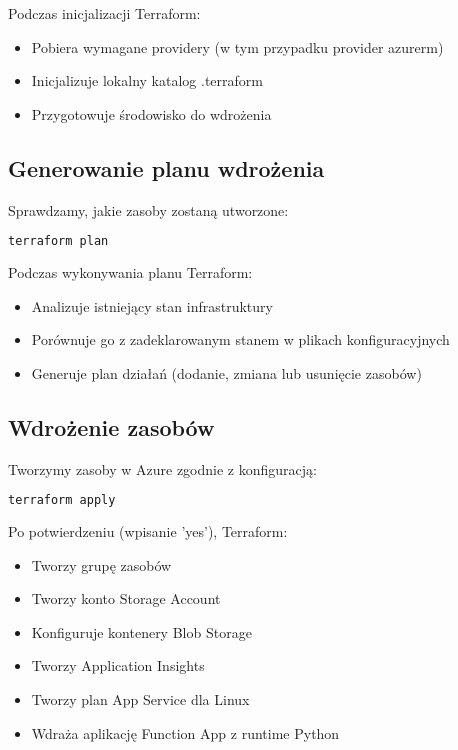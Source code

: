 \documentclass{article}
\begin{document}
Podczas inicjalizacji Terraform:
\begin{itemize}
    \item Pobiera wymagane providery (w tym przypadku provider azurerm)
    \item Inicjalizuje lokalny katalog .terraform
    \item Przygotowuje środowisko do wdrożenia
\end{itemize}

\subsection{Generowanie planu wdrożenia}

Sprawdzamy, jakie zasoby zostaną utworzone:

\begin{lstlisting}[language=bash]
terraform plan
\end{lstlisting}

Podczas wykonywania planu Terraform:
\begin{itemize}
    \item Analizuje istniejący stan infrastruktury
    \item Porównuje go z zadeklarowanym stanem w plikach konfiguracyjnych
    \item Generuje plan działań (dodanie, zmiana lub usunięcie zasobów)
\end{itemize}

\subsection{Wdrożenie zasobów}

Tworzymy zasoby w Azure zgodnie z konfiguracją:

\begin{lstlisting}[language=bash]
terraform apply
\end{lstlisting}

Po potwierdzeniu (wpisanie 'yes'), Terraform:
\begin{itemize}
    \item Tworzy grupę zasobów
    \item Tworzy konto Storage Account
    \item Konfiguruje kontenery Blob Storage
    \item Tworzy Application Insights
    \item Tworzy plan App Service dla Linux
    \item Wdraża aplikację Function App z runtime Python
\end{itemize}
\end{document}
